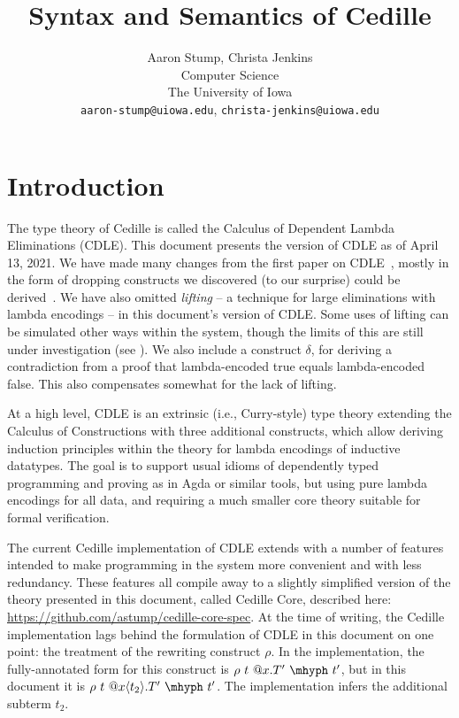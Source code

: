 \documentclass{article}
\begin{document}
\title{Syntax and Semantics of Cedille}

\author{Aaron Stump, Christa Jenkins \\
  Computer Science \\
  The University of Iowa \\
  \texttt{aaron-stump@uiowa.edu},
  \texttt{christa-jenkins@uiowa.edu}}

\date{}

\maketitle

\section{Introduction}

The type theory of Cedille is called the Calculus of Dependent Lambda
Eliminations (CDLE).  This document presents the version of CDLE as of
April 13, 2021.  We have made many changes from the first paper on CDLE~\cite{stump17},
mostly in the form of dropping constructs we discovered (to our
surprise) could be derived~\cite{stump18}. We have also omitted
\emph{lifting} -- a technique for large eliminations with lambda
encodings -- in this document's version of CDLE.  Some uses of lifting
can be simulated other ways within the system, though the limits of
this are still under investigation (see
\cite{JMS21_Simulating-Large-Elims-Cedille}).  We also include a construct 
$\delta$, for deriving a contradiction from a proof that
lambda-encoded true equals lambda-encoded false.  This also
compensates somewhat for the lack of lifting.

At a high level, CDLE is an extrinsic (i.e., Curry-style) type theory
extending the Calculus of Constructions with three additional
constructs, which allow deriving induction principles within the
theory for lambda encodings of inductive datatypes.  The goal is to support
usual idioms of dependently typed programming and proving as in Agda or
similar tools, but using pure lambda encodings for all data, and
requiring a much smaller core theory suitable for formal verification.

The current Cedille implementation of CDLE extends with a number of features
intended to make programming in the system more convenient and with less
redundancy.
These features all compile away to a slightly simplified version of the
theory presented in this document, called Cedille Core, described
here: \url{https://github.com/astump/cedille-core-spec}.
At the time of writing, the Cedille implementation lags behind the formulation
of CDLE in this document on one point: the treatment of the rewriting construct
\(\rho\).
In the implementation, the fully-annotated form for this construct is \(\rho\ t\
@x.T'\ \mhyph\ t'\), but in this document it is \(\rho\ t\ @x\langle
t_2 \rangle.T'\ \mhyph\ t'\).
The implementation infers the additional subterm \(t_2\).
\end{document}
